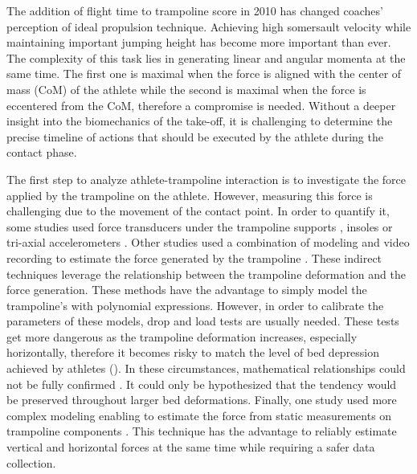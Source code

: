 The addition of flight time to trampoline score in 2010 \cite{Committee2010} has changed coaches' perception of ideal propulsion technique.
Achieving high somersault velocity while maintaining important jumping height has become more important than ever.
The complexity of this task lies in generating linear and angular momenta at the same time.
The first one is maximal when the force  is aligned with the center of mass (CoM) of the athlete while the second is maximal when the force is eccentered  from the CoM, therefore a compromise is needed.
Without a deeper insight into the biomechanics of the take-off, it is challenging to determine the precise timeline of actions that should be executed by the athlete during the contact phase.

The first step to analyze athlete-trampoline interaction is to investigate the force applied by the trampoline on the athlete.
However, measuring this force is challenging due to the movement of the contact point.
In order to quantify it, some studies used force transducers under the trampoline supports \cite{jacques2008determining, ando1987biomechanical, hennig1988loads}, insoles \cite{glitsch1992pressure} or tri-axial accelerometers \cite{eager2012characterisation} .
Other studies used a combination of modeling and video recording to estimate the force generated by the trampoline \cite{vaughan1980kinetic, blajer2001modeling, zuo2016finite, burke2015mechanics}.
These indirect techniques leverage the relationship between the trampoline deformation and the force generation.
These methods have the advantage to simply model the trampoline's  with polynomial expressions.
However, in order to calibrate the parameters of these models, drop and load tests are usually needed.
These tests get more dangerous as the trampoline deformation increases, especially horizontally, therefore it becomes risky to match the level of bed depression achieved by athletes ().
In these circumstances, mathematical relationships could not be fully confirmed . 
It could only be hypothesized that the tendency would be preserved throughout larger bed deformations.
Finally, one study used more complex modeling enabling to estimate the force from static measurements on trampoline components \cite{jacques2008determining} .
This technique has the advantage to reliably estimate vertical and horizontal forces at the same time while requiring  a safer data collection.


